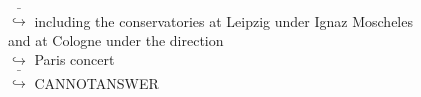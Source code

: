 \documentclass[11pt,a4paper, onecolumn]{article}
\begin{document}
\begin{figure}[t]
\begin{tcolorbox}[boxsep=0pt,left=5pt,right=0pt,top=2pt,colback = yellow!5]
\begin{dialogue}
\\
\colorbox{pink!25}{ $\bar{\hookrightarrow}$}
{ including the conservatories at Leipzig under Ignaz Moscheles and at Cologne under the direction }
\\
\colorbox{pink!25}{$\hookrightarrow$}
{ Paris concert }
\\
\colorbox{pink!25}{ $\bar{\hookrightarrow}$}
{ CANNOTANSWER }
\\
 \end{dialogue}\end{tcolorbox}\end{figure}
\end{document}
